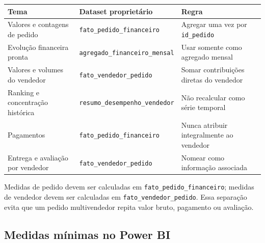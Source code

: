 \documentclass[12pt,a4paper]{article}
\newcounter{none}
\begin{document}
{\def\LTcaptype{none} %
\begin{longtable}[]{@{}
  >{\raggedright\arraybackslash}p{}
  >{\raggedright\arraybackslash}p{}
  >{\raggedright\arraybackslash}p{}@{}}
\toprule\noalign{}
\rowcolor{AzulCorporativo}
\begin{minipage}[b]{\linewidth}\raggedright\color{white}\bfseries
Tema
\end{minipage} & \begin{minipage}[b]{\linewidth}\raggedright\color{white}\bfseries
Dataset proprietário
\end{minipage} & \begin{minipage}[b]{\linewidth}\raggedright\color{white}\bfseries
Regra
\end{minipage} \\
\midrule\noalign{}
\endhead
\bottomrule\noalign{}
\endlastfoot
Valores e contagens de pedido & \nolinkurl{fato_pedido_financeiro} &
Agregar uma vez por \nolinkurl{id_pedido} \\
Evolução financeira pronta & \nolinkurl{agregado_financeiro_mensal} &
Usar somente como agregado mensal \\
Valores e volumes do vendedor & \nolinkurl{fato_vendedor_pedido} & Somar
contribuições diretas do vendedor \\
Ranking e concentração histórica &
\nolinkurl{resumo_desempenho_vendedor} & Não recalcular como série
temporal \\
Pagamentos & \nolinkurl{fato_pedido_financeiro} & Nunca atribuir
integralmente ao vendedor \\
Entrega e avaliação por vendedor & \nolinkurl{fato_vendedor_pedido} &
Nomear como informação associada \\
\end{longtable}
}

Medidas de pedido devem ser calculadas em
\nolinkurl{fato_pedido_financeiro}; medidas de vendedor devem ser
calculadas em \nolinkurl{fato_vendedor_pedido}. Essa separação evita que
um pedido multivendedor repita valor bruto, pagamento ou avaliação.

\subsection{Medidas mínimas no Power
BI}\label{docs__analytics__consumo_power_bi_sql.md__medidas-muxednimas-no-power-bi}
\end{document}
